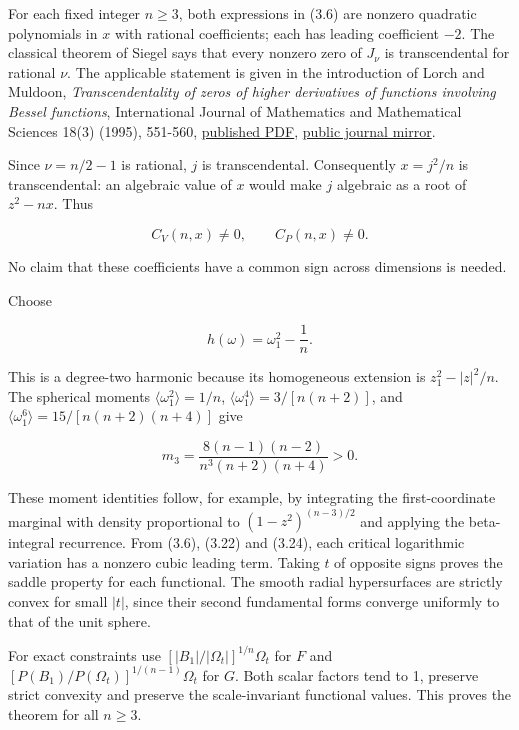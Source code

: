 \documentclass[11pt]{article}
\begin{document}
For each fixed integer \(n\ge3\), both expressions in (3.6) are nonzero
quadratic polynomials in \(x\) with rational coefficients; each has
leading coefficient \(-2\). The classical theorem of Siegel says that
every nonzero zero of \(J_\nu\) is transcendental for rational \(\nu\).
The applicable statement is given in the introduction of Lorch and
Muldoon, \emph{Transcendentality of zeros of higher derivatives of
functions involving Bessel functions}, International Journal of
Mathematics and Mathematical Sciences 18(3) (1995), 551-560,
\href{https://onlinelibrary.wiley.com/doi/pdf/10.1155/S0161171295000706}{published
PDF},
\href{https://www.maths.tcd.ie/EMIS/journals/HOA/IJMMS/Volume18_3/647167.pdf}{public
journal mirror}.

Since \(\nu=n/2-1\) is rational, \(j\) is transcendental. Consequently
\(x=j^2/n\) is transcendental: an algebraic value of \(x\) would make
\(j\) algebraic as a root of \(z^2-nx\). Thus

\[
C_V(n,x)\ne0,\qquad C_P(n,x)\ne0.
\tag{3.22}
\]

No claim that these coefficients have a common sign across dimensions is
needed.

Choose

\[
h(\omega)=\omega_1^2-\frac1n.
\tag{3.23}
\]

This is a degree-two harmonic because its homogeneous extension is
\(z_1^2-|z|^2/n\). The spherical moments
\(\langle\omega_1^2\rangle=1/n\),
\(\langle\omega_1^4\rangle=3/[n(n+2)]\), and
\(\langle\omega_1^6\rangle=15/[n(n+2)(n+4)]\) give

\[
m_3=\frac{8(n-1)(n-2)}{n^3(n+2)(n+4)}>0.
\tag{3.24}
\]

These moment identities follow, for example, by integrating the
first-coordinate marginal with density proportional to
\((1-z^2)^{(n-3)/2}\) and applying the beta-integral recurrence. From
(3.6), (3.22) and (3.24), each critical logarithmic variation has a
nonzero cubic leading term. Taking \(t\) of opposite signs proves the
saddle property for each functional. The smooth radial hypersurfaces are
strictly convex for small \(|t|\), since their second fundamental forms
converge uniformly to that of the unit sphere.

For exact constraints use \([|B_1|/|\Omega_t|]^{1/n}\Omega_t\) for \(F\)
and \([P(B_1)/P(\Omega_t)]^{1/(n-1)}\Omega_t\) for \(G\). Both scalar
factors tend to 1, preserve strict convexity and preserve the
scale-invariant functional values. This proves the theorem for all
\(n\ge3\).
\end{document}

